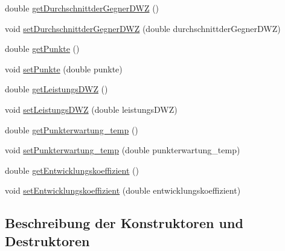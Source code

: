 \begin{DoxyCompactItemize}
\item 
double \hyperlink{classde_1_1dwzberechnung_1_1model_1_1_player_model_a304284e71ed0df2e4581bc77a8f6aa70}{get\+Durchschnittder\+Gegner\+D\+WZ} ()
\item 
void \hyperlink{classde_1_1dwzberechnung_1_1model_1_1_player_model_a5e90a81f2ffe4fe13d480fd262d62b13}{set\+Durchschnittder\+Gegner\+D\+WZ} (double durchschnittder\+Gegner\+D\+WZ)
\item 
double \hyperlink{classde_1_1dwzberechnung_1_1model_1_1_player_model_abe863b32171a94838f2ce8a577b87d72}{get\+Punkte} ()
\item 
void \hyperlink{classde_1_1dwzberechnung_1_1model_1_1_player_model_a0efc030a2e30d6ac40037a7d1b6bf5dd}{set\+Punkte} (double punkte)
\item 
double \hyperlink{classde_1_1dwzberechnung_1_1model_1_1_player_model_ad1d584dd0e5b300dc2d489d174eb7475}{get\+Leistungs\+D\+WZ} ()
\item 
void \hyperlink{classde_1_1dwzberechnung_1_1model_1_1_player_model_acf49d7160287709bd13cd19c8b7aaf88}{set\+Leistungs\+D\+WZ} (double leistungs\+D\+WZ)
\item 
double \hyperlink{classde_1_1dwzberechnung_1_1model_1_1_player_model_ad67ecf83db376aba4aa4aca5c84fb846}{get\+Punkterwartung\+\_\+temp} ()
\item 
void \hyperlink{classde_1_1dwzberechnung_1_1model_1_1_player_model_ac5736072de9c667b014328b1174bd302}{set\+Punkterwartung\+\_\+temp} (double punkterwartung\+\_\+temp)
\item 
double \hyperlink{classde_1_1dwzberechnung_1_1model_1_1_player_model_af602449b8021106f313969f18d8b93ea}{get\+Entwicklungskoeffizient} ()
\item 
void \hyperlink{classde_1_1dwzberechnung_1_1model_1_1_player_model_a4488ac35de3f598aa3b2497ba702ef6e}{set\+Entwicklungskoeffizient} (double entwicklungskoeffizient)
\end{DoxyCompactItemize}


\subsection{Beschreibung der Konstruktoren und Destruktoren}

